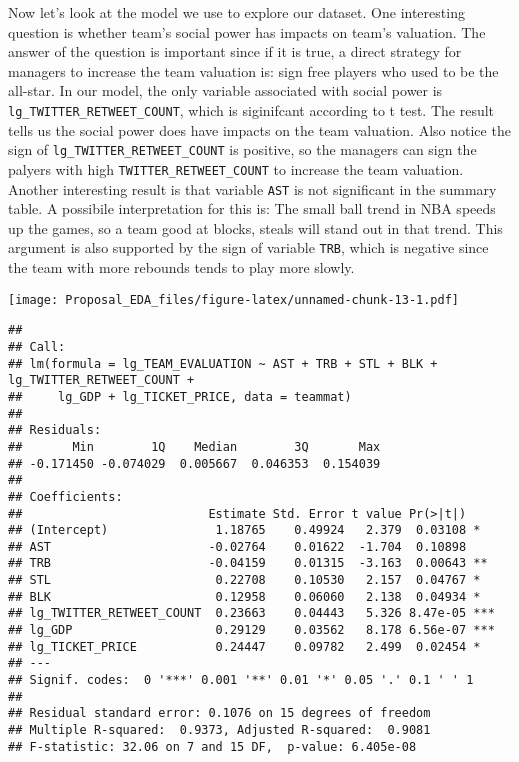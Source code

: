 \documentclass[12pt,]{article}
\begin{document}
Now let's look at the model we use to explore our dataset. One
interesting question is whether team's social power has impacts on
team's valuation. The answer of the question is important since if it is
true, a direct strategy for managers to increase the team valuation is:
sign free players who used to be the all-star. In our model, the only
variable associated with social power is
\texttt{lg\_TWITTER\_RETWEET\_COUNT}, which is siginifcant according to
t test. The result tells us the social power does have impacts on the
team valuation. Also notice the sign of
\texttt{lg\_TWITTER\_RETWEET\_COUNT} is positive, so the managers can
sign the palyers with high \texttt{TWITTER\_RETWEET\_COUNT} to increase
the team valuation. Another interesting result is that variable
\texttt{AST} is not significant in the summary table. A possibile
interpretation for this is: The small ball trend in NBA speeds up the
games, so a team good at blocks, steals will stand out in that trend.
This argument is also supported by the sign of variable \texttt{TRB},
which is negative since the team with more rebounds tends to play more
slowly.

\texttt{[image: Proposal\_EDA\_files/figure-latex/unnamed-chunk-13-1.pdf]}

\begin{verbatim}
## 
## Call:
## lm(formula = lg_TEAM_EVALUATION ~ AST + TRB + STL + BLK + lg_TWITTER_RETWEET_COUNT + 
##     lg_GDP + lg_TICKET_PRICE, data = teammat)
## 
## Residuals:
##       Min        1Q    Median        3Q       Max 
## -0.171450 -0.074029  0.005667  0.046353  0.154039 
## 
## Coefficients:
##                          Estimate Std. Error t value Pr(>|t|)    
## (Intercept)               1.18765    0.49924   2.379  0.03108 *  
## AST                      -0.02764    0.01622  -1.704  0.10898    
## TRB                      -0.04159    0.01315  -3.163  0.00643 ** 
## STL                       0.22708    0.10530   2.157  0.04767 *  
## BLK                       0.12958    0.06060   2.138  0.04934 *  
## lg_TWITTER_RETWEET_COUNT  0.23663    0.04443   5.326 8.47e-05 ***
## lg_GDP                    0.29129    0.03562   8.178 6.56e-07 ***
## lg_TICKET_PRICE           0.24447    0.09782   2.499  0.02454 *  
## ---
## Signif. codes:  0 '***' 0.001 '**' 0.01 '*' 0.05 '.' 0.1 ' ' 1
## 
## Residual standard error: 0.1076 on 15 degrees of freedom
## Multiple R-squared:  0.9373, Adjusted R-squared:  0.9081 
## F-statistic: 32.06 on 7 and 15 DF,  p-value: 6.405e-08
\end{verbatim}
\end{document}
